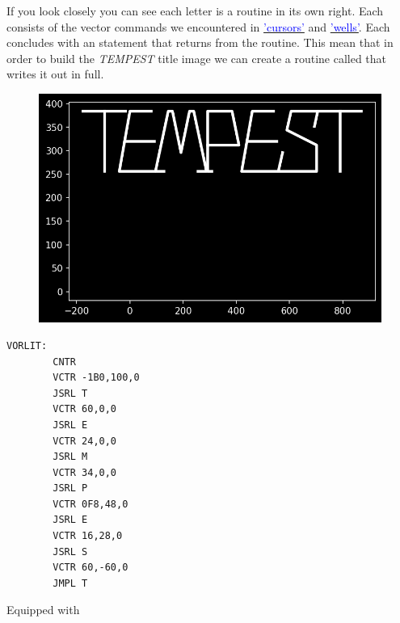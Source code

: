 \clearpage
If you look closely you can see each letter is a routine in its own right. Each consists of the vector commands
we encountered in
\hyperref[sec:cursors]{\textcolor{blue}{'cursors'}}
and
\hyperref[sec:wells]{\textcolor{blue}{'wells'}}. Each concludes with an  statement that returns
from the routine. This mean that in order to build the \textit{TEMPEST} title image
we can create a routine called  that writes it out in full.
\begin{minipage}[c]{0.58\linewidth}
\begin{figure}[H]
    \centering
    \begin{adjustbox}{width=6cm,center}
      \includegraphics[width=12cm]{src/titles/letters/TEMPEST.png}%
    \end{adjustbox}
\end{figure}
\end{minipage}
\begin{minipage}[c]{0.38\linewidth}
\begin{lstlisting}[basicstyle=\scriptsize\ttfamily]
VORLIT:
        CNTR
        VCTR -1B0,100,0
        JSRL T
        VCTR 60,0,0
        JSRL E
        VCTR 24,0,0
        JSRL M
        VCTR 34,0,0
        JSRL P
        VCTR 0F8,48,0
        JSRL E
        VCTR 16,28,0
        JSRL S
        VCTR 60,-60,0
        JMPL T
\end{lstlisting}
\vspace*{\fill}
\end{minipage}

Equipped with 

